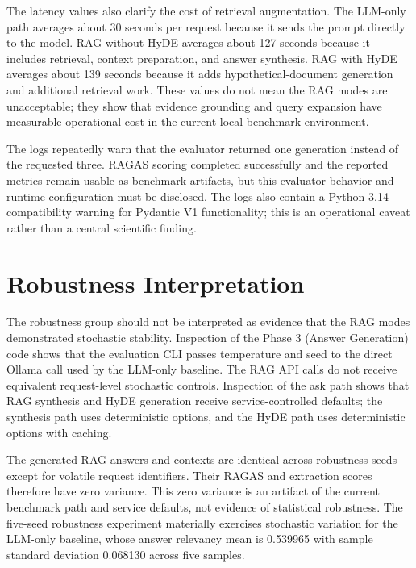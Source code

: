 The latency values also clarify the cost of retrieval augmentation. The LLM-only path averages about 30 seconds per request because it sends the prompt directly to the model. RAG without HyDE averages about 127 seconds because it includes retrieval, context preparation, and answer synthesis. RAG with HyDE averages about 139 seconds because it adds hypothetical-document generation and additional retrieval work. These values do not mean the RAG modes are unacceptable; they show that evidence grounding and query expansion have measurable operational cost in the current local benchmark environment.

The logs repeatedly warn that the evaluator returned one generation instead of the requested three. RAGAS scoring completed successfully and the reported metrics remain usable as benchmark artifacts, but this evaluator behavior and runtime configuration must be disclosed. The logs also contain a Python 3.14 compatibility warning for Pydantic V1 functionality; this is an operational caveat rather than a central scientific finding.

\section{Robustness Interpretation}

The robustness group should not be interpreted as evidence that the RAG modes demonstrated stochastic stability. Inspection of the Phase 3 (Answer Generation) code shows that the evaluation CLI passes temperature and seed to the direct Ollama call used by the LLM-only baseline. The RAG API calls do not receive equivalent request-level stochastic controls. Inspection of the ask path shows that RAG synthesis and HyDE generation receive service-controlled defaults; the synthesis path uses deterministic options, and the HyDE path uses deterministic options with caching.

The generated RAG answers and contexts are identical across robustness seeds except for volatile request identifiers. Their RAGAS and extraction scores therefore have zero variance. This zero variance is an artifact of the current benchmark path and service defaults, not evidence of statistical robustness. The five-seed robustness experiment materially exercises stochastic variation for the LLM-only baseline, whose answer relevancy mean is 0.539965 with sample standard deviation 0.068130 across five samples.

